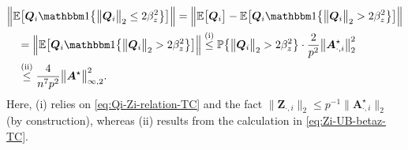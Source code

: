 %
\begin{align*}
 & \Big\|\mathbb{E}\big[\bm{Q}_{i}\mathbbm1\big\{\big\|\bm{Q}_{i}\big\|_{2}\leq2\beta_{z}^{2}\big\}\big]\Big\|=\Big\|\mathbb{E}\big[\bm{Q}_{i}\big]-\mathbb{E}\big[\bm{Q}_{i}\mathbbm1\big\{\big\|\bm{Q}_{i}\big\|_{2}>2\beta_{z}^{2}\big\}\big]\Big\|\\
	& \quad=\Big\|\mathbb{E}\big[\bm{Q}_{i}\mathbbm1\big\{\big\|\bm{Q}_{i}\big\|_{2}>2\beta_{z}^{2}\big\}\big]\Big\|\overset{(\mathrm{i})}{\leq}\mathbb{P}\big\{\big\|\bm{Q}_{i}\big\|_{2}>2\beta_{z}^2 \big\}\cdot  \frac{2}{p^{2}}\big\|\bm{A}^{\star}_{\cdot,i}\big\|_{2}^{2} \\
 & \quad\overset{(\mathrm{ii})}{\leq}  \frac{4}{n^7p^{2}}\big\|\bm{A}^{\star}\big\|_{\infty,2}^{2} .
\end{align*}
%
Here, (i) relies on \eqref{eq:Qi-Zi-relation-TC} and the fact $\|\bm{Z}_{\cdot,i}\|_2\leq p^{-1}\|\bm{A}^{\star}_{\cdot,i}\|_2$ (by construction), whereas (ii) results from the calculation in \eqref{eq:Zi-UB-betaz-TC}.







